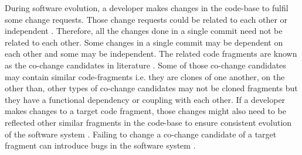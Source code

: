 \documentclass[review]{elsarticle}
\begin{document}
During software evolution, a developer makes changes in the code-base to fulfil some change requests. Those change requests could be related to each other or independent \cite{Mondal:Co-change-recommendation, Mondal:Connectivity:co-changed}. Therefore, all the changes done in a single commit need not be related to each other. Some changes in a single commit may be dependent on each other and some may be independent. The related code fragments are known as the co-change candidates in literature \cite{Mondal-2014-PRC-2597073-2597104rankingCoChange}. Some of those co-change candidates may contain similar code-fragments i.e. they are clones of one another, on the other than, other types of co-change candidates may not be cloned fragments but they have a functional dependency or coupling with each other. If a developer makes changes to a target code fragment, those changes might also need to be reflected other similar fragments in the code-base to ensure consistent evolution of the software system \cite{Mondal:Association:Rules, Mondal:Context:Adaptation:Bugs}. Failing to change a co-change candidate of a target fragment can introduce bugs in the software system \cite{Judith:Bug:Replication, Judith:Micro:Regular:Clone}. 
\end{document}
